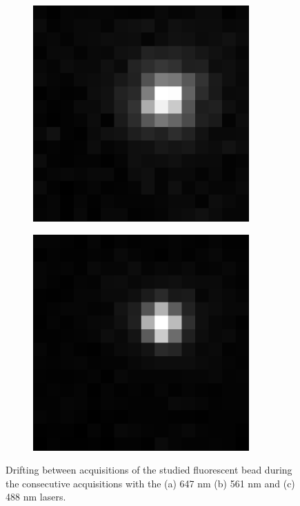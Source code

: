 \begin{figure}
\begin{subfigure}{0.32\textwidth}
        \includegraphics[width=\textwidth]{figures/beads_drifting_561nm.pdf}
        \caption{}
        \label{fig:beads_drifting_561nm}
    \end{subfigure}
    \begin{subfigure}{0.32\textwidth}
        \includegraphics[width=\textwidth]{figures/beads_drifting_488nm.pdf}
        \caption{}
        \label{fig:beads_drifting_488nm}
    \end{subfigure}
    \caption{Drifting between acquisitions of the studied fluorescent bead during the consecutive acquisitions with the (a) 647 nm (b) 561 nm and (c) 488 nm lasers.}
    \label{fig:beads_drifting}
\end{figure}
